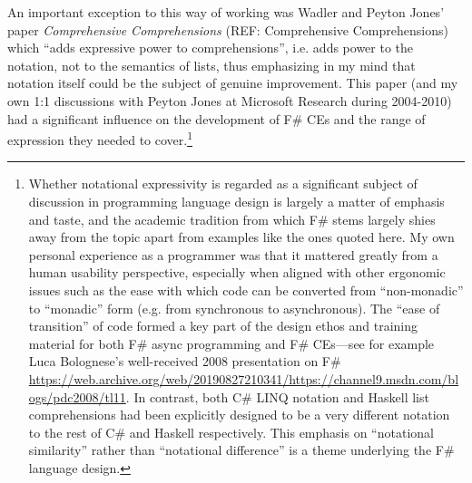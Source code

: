 \documentclass[acmsmall]{acmart}\settopmatter{}
\begin{document}
An important exception to this way of working was Wadler and Peyton Jones' paper
\textit{Comprehensive Comprehensions} (REF: Comprehensive Comprehensions) which
``adds expressive power to comprehensions'', i.e. adds power to the notation, not to the semantics of lists, thus emphasizing in my mind that
notation itself could be the subject of genuine improvement.
This paper (and my own 1:1 discussions with Peyton Jones at Microsoft Research during 2004-2010) had a significant influence on the
development of F\# CEs and the range of expression they needed to cover.\footnote{Whether notational expressivity is regarded as
a significant subject of discussion in programming language design is largely a matter of emphasis and taste, and the academic
tradition from which F\# stems largely shies away from the topic apart from examples like the ones quoted here.
My own personal experience as a programmer was that it mattered greatly from a human usability perspective, especially
when aligned with other ergonomic issues such as the ease with which code can be converted from ``non-monadic'' to ``monadic''
form (e.g. from synchronous to asynchronous). The ``ease of transition'' of code formed a key part
of the design ethos and training material for both F\# async programming and F\#  CEs---see for example Luca Bolognese's
well-received 2008 presentation on F\# \url{https://web.archive.org/web/20190827210341/https://channel9.msdn.com/blogs/pdc2008/tl11}.  In contrast, both C\# LINQ notation
and Haskell list comprehensions had been explicitly designed to be a very different notation to the rest of C\# and Haskell respectively.
This emphasis on ``notational similarity'' rather than ``notational difference'' is a theme underlying the F\# language design.}
\end{document}
